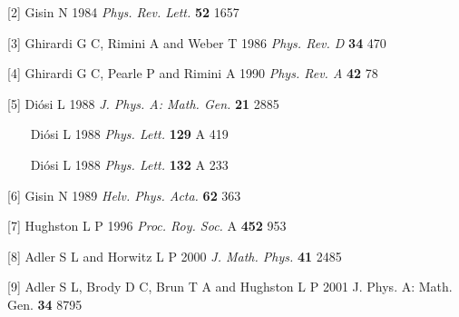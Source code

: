 \bigskip 
\noindent
\item{[2]} Gisin N 1984 {\it Phys. Rev. Lett.} {\bf 52} 1657
\bigskip
\noindent
\item{[3]}  Ghirardi G C, Rimini A and Weber T 1986 {\it Phys. Rev. D} 
{\bf 34} 470
\bigskip
\noindent
\item{[4]} Ghirardi G C, Pearle P and Rimini A 1990 {\it Phys. Rev. A} 
{\bf 42} 78
\bigskip
\noindent
\item{[5]}  Di\'osi L 1988 {\it J. Phys. A: Math. Gen.} {\bf 21} 2885
\item{~~~}  Di\'osi L 1988 {\it Phys. Lett.} {\bf 129} A 419
\item{~~~}  Di\'osi L 1988 {\it Phys. Lett.} {\bf 132} A 233
\bigskip
\noindent
\item{[6]}  Gisin N 1989 {\it Helv. Phys. Acta.} {\bf 62} 363
\bigskip
\noindent
\item{[7]}  Hughston L P 1996 {\it Proc. Roy. Soc.} A {\bf 452} 953
\bigskip
\noindent
\item{[8]}  Adler S L and Horwitz L P 2000 {\it J. Math. Phys.} {\bf 41} 2485
\bigskip
\noindent
\item{[9]}  Adler S L, Brody D C, Brun T A and Hughston L P 2001 
{J. Phys. A: Math. Gen.} {\bf 34} 8795
\bigskip
\noindent

\bigskip
\noindent
\bigskip
\noindent
\vfill
\eject
\bye

